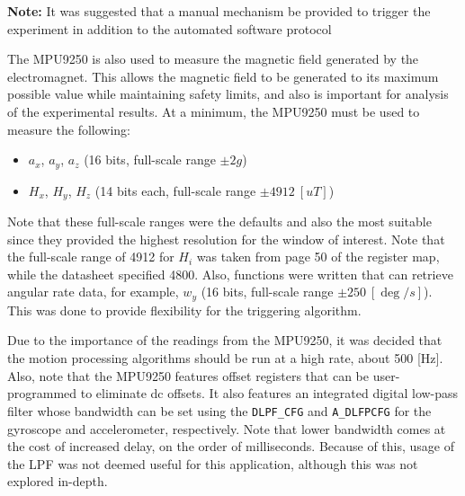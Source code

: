 \documentclass{article}
\begin{document}
\textbf{Note:} It was suggested that a manual mechanism be provided to trigger the experiment in addition to the automated software protocol
\newline
\newline

The MPU9250 is also used to measure the magnetic field generated by the electromagnet. This allows the magnetic field to be generated to its maximum possible value while maintaining safety limits, and also is important for analysis of the experimental results.
\newline
\newline
At a minimum, the MPU9250 must be used to measure the following:
\begin{itemize}
	\item $a_x$, $a_y$, $a_z$ (16 bits, full-scale range $\pm 2g$)
	\item $H_x$, $H_y$, $H_z$ (14 bits each, full-scale range $\pm 4912 \ [uT]$)
\end{itemize}

Note that these full-scale ranges were the defaults and also the most suitable since they provided the highest resolution for the window of interest. Note that the full-scale range of 4912 for $H_i$ was taken from page 50 of the register map, while the datasheet specified 4800.
\newline
\newline
Also, functions were written that can retrieve angular rate data, for example, $w_y$ (16 bits, full-scale range $\pm 250 \ [\deg/s]$). This was done to provide flexibility for the triggering algorithm.
\newline
\newline

Due to the importance of the readings from the MPU9250, it was decided that the motion processing algorithms should be run at a high rate, about 500 [Hz]. Also, note that the MPU9250 features offset registers that can be user-programmed to eliminate dc offsets. It also features an integrated digital low-pass filter whose bandwidth can be set using the \texttt{DLPF\_CFG} and \texttt{A\_DLFPCFG} for the gyroscope and accelerometer, respectively. Note that lower bandwidth comes at the cost of increased delay, on the order of milliseconds. Because of this, usage of the LPF was not deemed useful for this application, although this was not explored in-depth.
\end{document}
